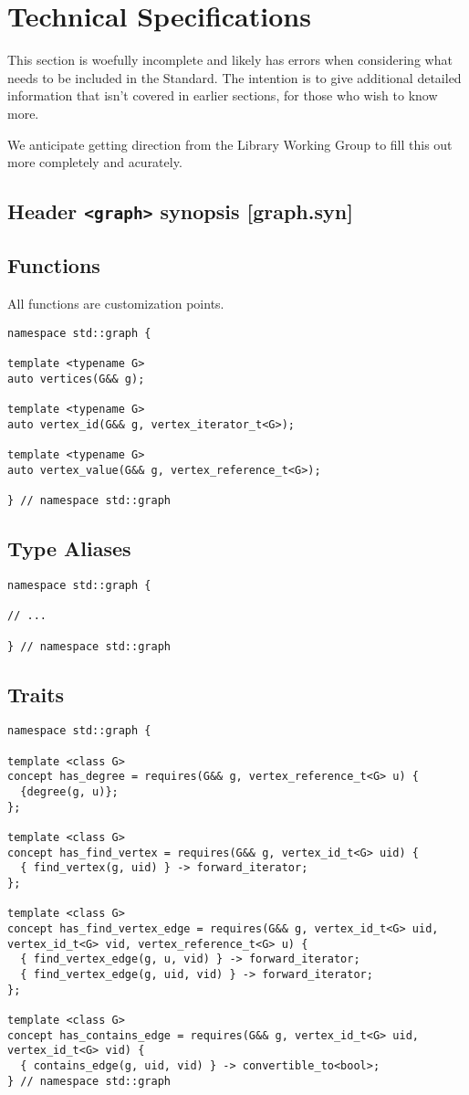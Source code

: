 \documentclass[10pt,onecolumn]{article}
\newcommand{\tcode}[1]{\lstinline[breaklines=true]{#1}}
\begin{document}
\section{Technical Specifications}
This section is woefully incomplete and likely has errors when considering what needs to be included in the Standard. The intention is to give additional detailed information that isn't covered in earlier sections, for those who wish to know more.

We anticipate getting direction from the Library Working Group to fill this out more completely and acurately.

\subsection{Header \tcode{<graph>} synopsis [graph.syn]}

\subsection{Functions}
All functions are customization points.

\begin{lstlisting}
namespace std::graph {

template <typename G>
auto vertices(G&& g);

template <typename G>
auto vertex_id(G&& g, vertex_iterator_t<G>);

template <typename G>
auto vertex_value(G&& g, vertex_reference_t<G>);

} // namespace std::graph
\end{lstlisting}

\subsection{Type Aliases}
\begin{lstlisting}
namespace std::graph {

// ...

} // namespace std::graph
\end{lstlisting}

\subsection{Traits}
\begin{lstlisting}
namespace std::graph {

template <class G>
concept has_degree = requires(G&& g, vertex_reference_t<G> u) {
  {degree(g, u)};
};

template <class G>
concept has_find_vertex = requires(G&& g, vertex_id_t<G> uid) {
  { find_vertex(g, uid) } -> forward_iterator;
};

template <class G>
concept has_find_vertex_edge = requires(G&& g, vertex_id_t<G> uid, vertex_id_t<G> vid, vertex_reference_t<G> u) {
  { find_vertex_edge(g, u, vid) } -> forward_iterator;
  { find_vertex_edge(g, uid, vid) } -> forward_iterator;
};

template <class G>
concept has_contains_edge = requires(G&& g, vertex_id_t<G> uid, vertex_id_t<G> vid) {
  { contains_edge(g, uid, vid) } -> convertible_to<bool>;
} // namespace std::graph
\end{lstlisting}
\end{document}
